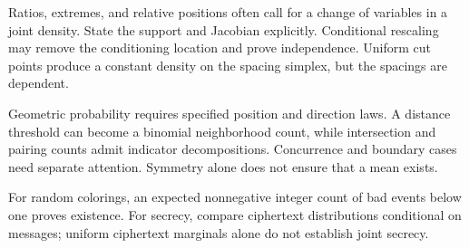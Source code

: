 Ratios, extremes, and relative positions often call for a change of variables in a joint density. State the support and Jacobian explicitly. Conditional rescaling may remove the conditioning location and prove independence. Uniform cut points produce a constant density on the spacing simplex, but the spacings are dependent.

Geometric probability requires specified position and direction laws. A distance threshold can become a binomial neighborhood count, while intersection and pairing counts admit indicator decompositions. Concurrence and boundary cases need separate attention. Symmetry alone does not ensure that a mean exists.

For random colorings, an expected nonnegative integer count of bad events below one proves existence. For secrecy, compare ciphertext distributions conditional on messages; uniform ciphertext marginals alone do not establish joint secrecy.
\par\smallskip
